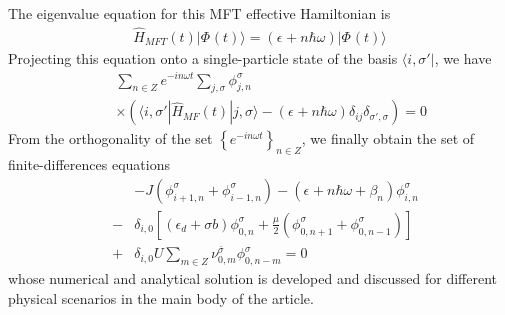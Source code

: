 \documentclass[aps,twocolumn,showpacs,floatfix,prl]{revtex4}
\begin{document}
The eigenvalue equation for this MFT effective Hamiltonian is
\begin{eqnarray}
\hat{H}_{MFT}(t)|\Phi_{}(t)\rangle = \left(\epsilon_{} + n\hbar\omega\right)|\Phi_{}(t)\rangle
\label{eq_eigenMFT}
\end{eqnarray}
Projecting this equation onto a single-particle state of the basis $\langle i,\sigma'|$, we have 
\begin{eqnarray}
& & \sum_{n\in Z} e^{-i n \omega t} \sum_{j,\sigma}\phi_{j,n}^{\sigma} \\&&\times\left( \langle i,\sigma'|\hat{H}_{MF}(t)|j,\sigma\rangle
- (\epsilon_{} + n\hbar\omega)\delta_{ij}\delta_{\sigma',\sigma}\right) = 0\nonumber
\label{eq8}
\end{eqnarray}
From the orthogonality of the set $\left\{ e^{-i n \omega t} \right\}_{n\in Z}$, we finally obtain the set of finite-differences equations
\begin{eqnarray}
&&-J\left( \phi_{i+1,n}^{\sigma} + \phi_{i-1,n}^{\sigma} \right) - \left(\epsilon_{} + n\hbar\omega + \beta_{n}^{} \right)\phi_{i,n}^{\sigma}\nonumber\\
&-&\delta_{i,0}\left[\left(\epsilon_d + \sigma b \right)\phi_{0,n}^{\sigma} + \frac{\mu}{2}\left(\phi_{0,n+1}^{\sigma} + \phi_{0,n-1}^{\sigma} \right) \right]\nonumber\\
&+&\delta_{i,0}U\sum_{m\in Z}\nu_{0,m}^{\bar{\sigma}}\phi_{0,n-m}^{\sigma} = 0
\label{eq9}
\end{eqnarray}
whose numerical and analytical solution is developed and discussed for different physical
scenarios in the main body of the article.






 
\end{document}
